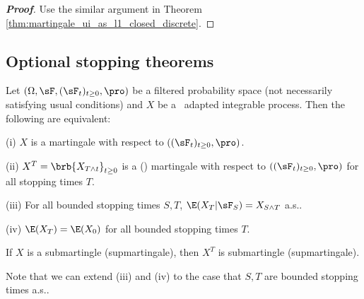 \begin{proof}[\bf Proof]
Use the similar argument in Theorem \ref{thm:martingale_ui_as_l1_closed_discrete}.
\end{proof}

\subsection{Optional stopping theorems}

\begin{theorem}\label{thm:optional_stopping_bounded_stopping_time_continuous}
Let $(\Omega,\sF,(\sF_t)_{t\geq 0}, \pro)$ be a filtered probability space (not necessarily satisfying usual conditions) and $X$ be a \cadlag\ adapted integrable process. Then the following are equivalent:
\ben
\item [(i)] $X$ is a martingale with respect to $((\sF_t)_{t\geq 0},\pro)$.
\item [(ii)] $X^T = \brb{X_{T\land t}}_{t\geq 0}$ is a (\cadlag) martingale with respect to $((\sF_t)_{t\geq 0},\pro)$ for all stopping times $T$.%
\item [(iii)] For all bounded stopping times $S,T$, $\E(X_T|\sF_S) = X_{S\land T}$ a.s..
\item [(iv)] $\E(X_T) = \E(X_0)$ for all bounded stopping times $T$.
\een
\end{theorem}

\begin{remark}
If $X$ is a submartingle (supmartingale), then $X^T$ is submartingle (supmartingale).

Note that we can extend (iii) and (iv) to the case that $S,T$ are bounded stopping times a.s..
\end{remark}

